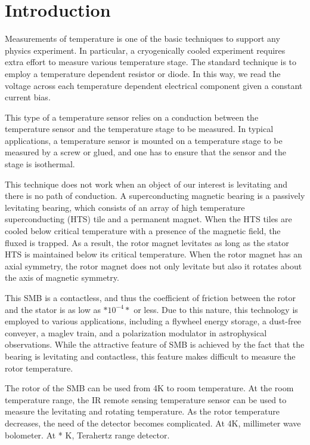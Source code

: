 \section{Introduction}

Measurements of temperature is one of the basic techniques to support any physics experiment. 
In particular, a cryogenically cooled experiment requires extra effort to measure various temperature stage.
The standard technique is to employ a temperature dependent resistor or diode. 
In this way, we read the voltage across each temperature dependent electrical component given a constant current bias. 

This type of a temperature sensor relies on a conduction between the temperature sensor and the temperature stage to be measured. 
In typical applications, a temperature sensor is mounted on a temperature stage to be measured by a screw or glued, and one has to ensure that the sensor and the stage is isothermal. 

This technique does not work when an object of our interest is levitating and there is no path of conduction. 
A superconducting magnetic bearing is a passively levitating bearing, which consists of an array of high temperature superconducting (HTS) tile and a permanent magnet. 
When the HTS tiles are cooled below critical temperature with a presence of the magnetic field, the fluxed is trapped. 
As a result, the rotor magnet levitates as long as the stator HTS is maintained below its critical temperature. 
When the rotor magnet has an axial symmetry, the rotor magnet does not only levitate but also it rotates about the axis of magnetic symmetry. 

This SMB is a contactless, and thus the coefficient of friction between the rotor and the stator is as low as $*10^{-4}*$ or less. 
Due to this nature, this technology is employed to various applications, including a flywheel energy storage, a dust-free conveyer, a maglev train, and a polarization modulator in astrophysical observations.
While the attractive feature of SMB is achieved by the fact that the bearing is levitating and contactless, this feature makes difficult to measure the rotor temperature. 

The rotor of the SMB can be used from 4K to room temperature. 
At the room temperature range, the IR remote sensing temperature sensor can be used to measure the levitating and rotating temperature. 
As the rotor temperature decreases, the need of the detector becomes complicated. 
At 4K, millimeter wave bolometer. 
At * K, Terahertz range detector. 

